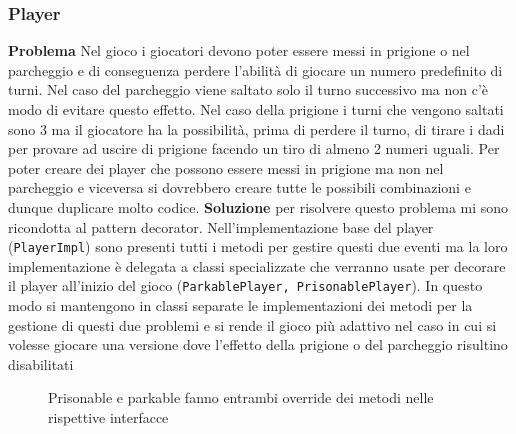 \subsubsection{Player}
\textbf{Problema}\newline
Nel gioco i giocatori devono poter essere messi in prigione o nel parcheggio e di conseguenza perdere l’abilità di giocare un numero predefinito di turni. 
Nel caso del parcheggio viene saltato solo il turno successivo ma non c’è modo di evitare questo effetto.
Nel caso della prigione i turni che vengono saltati sono 3 ma il giocatore ha la possibilità, prima di perdere il turno, di tirare i dadi per provare ad uscire di prigione facendo un tiro di almeno 2 numeri uguali.
Per poter creare dei player che possono essere messi in prigione ma non nel parcheggio e viceversa si dovrebbero creare tutte le possibili combinazioni e dunque duplicare molto codice.\newline
\textbf{Soluzione}\newline
per risolvere questo problema mi sono ricondotta al pattern decorator. 
Nell'implementazione base del player (\texttt{PlayerImpl}) sono presenti tutti i metodi per gestire questi due eventi ma la loro implementazione è delegata a classi specializzate che verranno usate per decorare il player all’inizio del gioco (\texttt{ParkablePlayer, PrisonablePlayer}). 
In questo modo si mantengono in classi separate le implementazioni dei metodi per la gestione di questi due problemi e si rende il gioco più adattivo nel caso in cui si volesse giocare una versione dove l’effetto della prigione o del parcheggio risultino disabilitati
\begin{figure}[H]
    \centering
    \caption{Prisonable e parkable fanno entrambi override dei metodi nelle rispettive interfacce}
    \label{img:ArchitectureDiagram-Pagina-2}
\end{figure}

